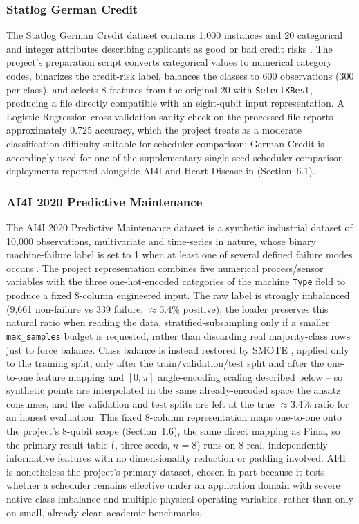 \subsubsection{Statlog German Credit}
The Statlog German Credit dataset contains 1,000 instances and 20 categorical and integer attributes describing applicants as good or bad credit risks \citep{hofmann1994german}. The project's preparation script converts categorical values to numerical category codes, binarizes the credit-risk label, balances the classes to 600 observations (300 per class), and selects 8 features from the original 20 with \texttt{SelectKBest}, producing a file directly compatible with an eight-qubit input representation. A Logistic Regression cross-validation sanity check on the processed file reports approximately 0.725 accuracy, which the project treats as a moderate classification difficulty suitable for scheduler comparison; German Credit is accordingly used for one of the supplementary single-seed scheduler-comparison deployments reported alongside AI4I and Heart Disease in  (Section~6.1).

\subsubsection{AI4I 2020 Predictive Maintenance}
The AI4I 2020 Predictive Maintenance dataset is a synthetic industrial dataset of 10,000 observations, multivariate and time-series in nature, whose binary machine-failure label is set to 1 when at least one of several defined failure modes occurs \citep{matzka2020ai4i}. The project representation combines five numerical process/sensor variables with the three one-hot-encoded categories of the machine \texttt{Type} field to produce a fixed 8-column engineered input. The raw label is strongly imbalanced (9,661 non-failure vs 339 failure, $\approx$3.4\% positive); the loader preserves this natural ratio when reading the data, stratified-subsampling only if a smaller \texttt{max\_samples} budget is requested, rather than discarding real majority-class rows just to force balance. Class balance is instead restored by SMOTE \citep{chawla2002smote}, applied only to the training split, only after the train/validation/test split and after the one-to-one feature mapping and $[0,\pi]$ angle-encoding scaling described below -- so synthetic points are interpolated in the same already-encoded space the ansatz consumes, and the validation and test splits are left at the true $\approx$3.4\% ratio for an honest evaluation. This fixed 8-column representation maps one-to-one onto the project's 8-qubit scope (Section~1.6), the same direct mapping as Pima, so the primary result table (, three seeds, $n=8$) runs on 8 real, independently informative features with no dimensionality reduction or padding involved. AI4I is nonetheless the project's primary dataset, chosen in part because it tests whether a scheduler remains effective under an application domain with severe native class imbalance and multiple physical operating variables, rather than only on small, already-clean academic benchmarks.

